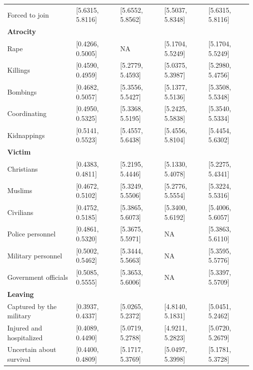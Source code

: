 \begin{table}[H]
\begin{threeparttable}
\begin{tabular}{lllll}
Forced to join          & [5.6315, 5.8116]      & [5.6552, 5.8562]      & [5.5037, 5.8348]      & [5.6315, 5.8116]\\ [0.9ex]
\textbf{Atrocity} \\  
Rape         & [0.4266, 0.5005]                 & NA                    & [5.1704, 5.5249]      & [5.1704, 5.5249]\\ 
Killings     & [0.4590, 0.4959]                 & [5.2779, 5.4593]      & [5.0375, 5.3987]      & [5.2980, 5.4756]\\ 
Bombings     & [0.4682, 0.5057]                 & [5.3556, 5.5427]      & [5.1377, 5.5136]      & [5.3508, 5.5348]\\ 
Coordinating & [0.4950, 0.5325]                 & [5.3368, 5.5195]      & [5.2425, 5.5838]      & [5.3540, 5.5334]\\ 
Kidnappings  & [0.5141, 0.5523]                 & [5.4557, 5.6438]      & [5.4556, 5.8104]      & [5.4454, 5.6302]\\ [0.9ex]
\textbf{Victim} \\  
Christians  & [0.4383, 0.4811]                  & [5.2195, 5.4446]      & [5.1330, 5.4078]      & [5.2275, 5.4341]\\ 
Muslims     & [0.4672, 0.5102]                  & [5.3249, 5.5506]      & [5.2776, 5.5554]      & [5.3224, 5.5316]\\ 
Civilians   & [0.4752, 0.5185]                  & [5.3865, 5.6073]      & [5.3400, 5.6192]      & [5.4006, 5.6057]\\ 
Police personnel    & [0.4861, 0.5320]          & [5.3675, 5.5971]      & NA                    & [5.3863, 5.6110]\\ 
Military personnel  & [0.5002, 0.5462]          & [5.3444, 5.5663]      & NA                    & [5.3595, 5.5776]\\ 
Government officials &[0.5085, 0.5555]          & [5.3653, 5.6006]      & NA                    & [5.3397, 5.5709]\\ [0.9ex]
\textbf{Leaving} \\  
Captured by the military & [0.3937, 0.4337]             & [5.0265, 5.2372]      & [4.8140, 5.1831]      & [5.0451, 5.2462]\\ 
Injured and hospitalized & [0.4089, 0.4490]             & [5.0719, 5.2788]      & [4.9211, 5.2823]      & [5.0720, 5.2679]\\ 
Uncertain about survival & [0.4400, 0.4809]             & [5.1717, 5.3769]      & [5.0497, 5.3998]      & [5.1781, 5.3728]\\ 

\end{tabular}
\end{threeparttable}
\end{table}

